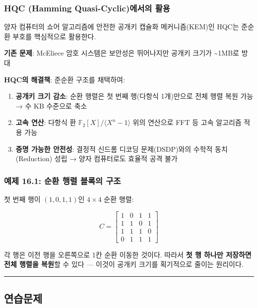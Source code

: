 \documentclass[
  oneside]{article}
\providecommand{\tightlist}{%
  \setlength{\itemsep}{0pt}\setlength{\parskip}{0pt}}
\begin{document}
\subsubsection{HQC (Hamming Quasi-Cyclic)에서의
활용}\label{hqc-hamming-quasi-cyclicuxc5d0uxc11cuxc758-uxd65cuxc6a9}

양자 컴퓨터의 쇼어 알고리즘에 안전한 공개키 캡슐화 메커니즘(KEM)인 HQC는
준순환 부호를 핵심적으로 활용한다.

\textbf{기존 문제}: McEliece 암호 시스템은 보안성은 뛰어나지만 공개키
크기가 \textasciitilde1MB로 방대

\textbf{HQC의 해결책}: 준순환 구조를 채택하여:

\begin{enumerate}
\def\labelenumi{\arabic{enumi}.}
\tightlist
\item
  \textbf{공개키 크기 감소}: 순환 행렬은 첫 번째 행(다항식 1개)만으로
  전체 행렬 복원 가능 → 수 KB 수준으로 축소
\item
  \textbf{고속 연산}: 다항식 환
  \(\mathbb{F}_2[X]/\langle X^n - 1 \rangle\) 위의 연산으로 FFT 등 고속
  알고리즘 적용 가능
\item
  \textbf{증명 가능한 안전성}: 결정적 신드롬 디코딩 문제(DSDP)와의
  수학적 동치(Reduction) 성립 → 양자 컴퓨터로도 효율적 공격 불가
\end{enumerate}

\subsubsection{예제 16.1: 순환 행렬 블록의
구조}\label{uxc608uxc81c-16.1-uxc21cuxd658-uxd589uxb82c-uxbe14uxb85duxc758-uxad6cuxc870}

첫 번째 행이 \((1, 0, 1, 1)\)인 \(4 \times 4\) 순환 행렬:

\[C = \begin{bmatrix}
1 & 0 & 1 & 1 \\
1 & 1 & 0 & 1 \\
1 & 1 & 1 & 0 \\
0 & 1 & 1 & 1
\end{bmatrix}\]

각 행은 이전 행을 오른쪽으로 1칸 순환 이동한 것이다. 따라서 \textbf{첫
행 하나만 저장하면 전체 행렬을 복원}할 수 있다 --- 이것이 공개키 크기를
획기적으로 줄이는 원리이다.

\begin{center}\rule{0.5\linewidth}{0.5pt}\end{center}

\subsection{연습문제}\label{uxc5f0uxc2b5uxbb38uxc81c}
\end{document}

